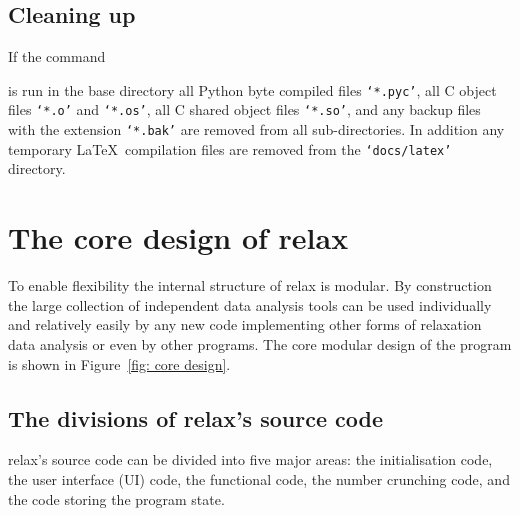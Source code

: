 \subsection{Cleaning up}

If the command


is run in the base directory all Python byte compiled files \texttt{`*.pyc'}, all C object files \texttt{`*.o'} and \texttt{`*.os'}, all C shared object files \texttt{`*.so'}, and any backup files with the extension \texttt{`*.bak'} are removed from all sub-directories.  In addition any temporary \LaTeX\ compilation files are removed from the \texttt{`docs/latex'} directory.




\section{The core design of relax}

To enable flexibility the internal structure of relax is modular.  By construction the large collection of independent data analysis tools can be used individually and relatively easily by any new code implementing other forms of relaxation data analysis or even by other programs.  The core modular design of the program is shown in Figure~\ref{fig: core design}.



\subsection{The divisions of relax's source code}

relax's source code can be divided into five major areas:  the initialisation code, the user interface (UI) code, the functional code, the number crunching code, and the code storing the program state.

